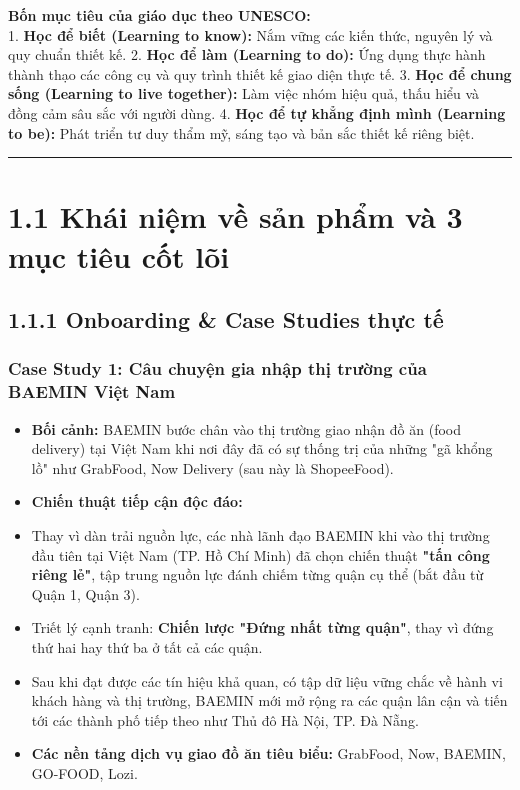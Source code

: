\documentclass[11pt,a4paper,oneside]{report}
\begin{document}
\begin{myquote}
\textbf{\large Bốn mục tiêu của giáo dục theo UNESCO:}\\
1. \textbf{Học để biết (Learning to know):} Nắm vững các kiến thức, nguyên lý và quy chuẩn thiết kế.
2. \textbf{Học để làm (Learning to do):} Ứng dụng thực hành thành thạo các công cụ và quy trình thiết kế giao diện thực tế.
3. \textbf{Học để chung sống (Learning to live together):} Làm việc nhóm hiệu quả, thấu hiểu và đồng cảm sâu sắc với người dùng.
4. \textbf{Học để tự khẳng định mình (Learning to be):} Phát triển tư duy thẩm mỹ, sáng tạo và bản sắc thiết kế riêng biệt.
\end{myquote}

\bigskip\hrule\bigskip

\section{1.1 Khái niệm về sản phẩm và 3 mục tiêu cốt lõi}

\subsection{1.1.1 Onboarding \& Case Studies thực tế}

\subsubsection{Case Study 1: Câu chuyện gia nhập thị trường của BAEMIN Việt Nam}
\begin{itemize}[leftmargin=1.5em]
\item \textbf{Bối cảnh:} BAEMIN bước chân vào thị trường giao nhận đồ ăn (food delivery) tại Việt Nam khi nơi đây đã có sự thống trị của những "gã khổng lồ" như GrabFood, Now Delivery (sau này là ShopeeFood).
\item \textbf{Chiến thuật tiếp cận độc đáo:}
\item Thay vì dàn trải nguồn lực, các nhà lãnh đạo BAEMIN khi vào thị trường đầu tiên tại Việt Nam (TP. Hồ Chí Minh) đã chọn chiến thuật \textbf{"tấn công riêng lẻ"}, tập trung nguồn lực đánh chiếm từng quận cụ thể (bắt đầu từ Quận 1, Quận 3).
\item Triết lý cạnh tranh: \textbf{Chiến lược "Đứng nhất từng quận"}, thay vì đứng thứ hai hay thứ ba ở tất cả các quận.
\item Sau khi đạt được các tín hiệu khả quan, có tập dữ liệu vững chắc về hành vi khách hàng và thị trường, BAEMIN mới mở rộng ra các quận lân cận và tiến tới các thành phố tiếp theo như Thủ đô Hà Nội, TP. Đà Nẵng.
\item \textbf{Các nền tảng dịch vụ giao đồ ăn tiêu biểu:} GrabFood, Now, BAEMIN, GO-FOOD, Lozi.
\end{itemize}
\end{document}
